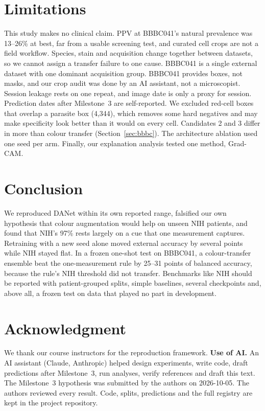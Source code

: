 \documentclass[conference]{IEEEtran}
\begin{document}
\section{Limitations}
This study makes no clinical claim. PPV at BBBC041's natural prevalence was 13--26\% at best, far from a usable screening test, and curated cell crops are not a field workflow. Species, stain and acquisition change together between datasets, so we cannot assign a transfer failure to one cause. BBBC041 is a single external dataset with one dominant acquisition group. BBBC041 provides boxes, not masks, and our crop audit was done by an AI assistant, not a microscopist. Session leakage rests on one repeat, and image date is only a proxy for session. Prediction dates after Milestone~3 are self-reported. We excluded red-cell boxes that overlap a parasite box (4{,}344), which removes some hard negatives and may make specificity look better than it would on every cell. Candidates 2 and 3 differ in more than colour transfer (Section~\ref{sec:bbbc}). The architecture ablation used one seed per arm. Finally, our explanation analysis tested one method, Grad-CAM.

\section{Conclusion}
We reproduced DANet within its own reported range, falsified our own hypothesis that colour augmentation would help on unseen NIH patients, and found that NIH's 97\% rests largely on a cue that one measurement captures. Retraining with a new seed alone moved external accuracy by several points while NIH stayed flat. In a frozen one-shot test on BBBC041, a colour-transfer ensemble beat the one-measurement rule by 25--31 points of balanced accuracy, because the rule's NIH threshold did not transfer. Benchmarks like NIH should be reported with patient-grouped splits, simple baselines, several checkpoints and, above all, a frozen test on data that played no part in development.

\section*{Acknowledgment}
We thank our course instructors for the reproduction framework. \textbf{Use of AI.} An AI assistant (Claude, Anthropic) helped design experiments, write code, draft predictions after Milestone~3, run analyses, verify references and draft this text. The Milestone~3 hypothesis was submitted by the authors on 2026-10-05. The authors reviewed every result. Code, splits, predictions and the full registry are kept in the project repository.



\end{document}
